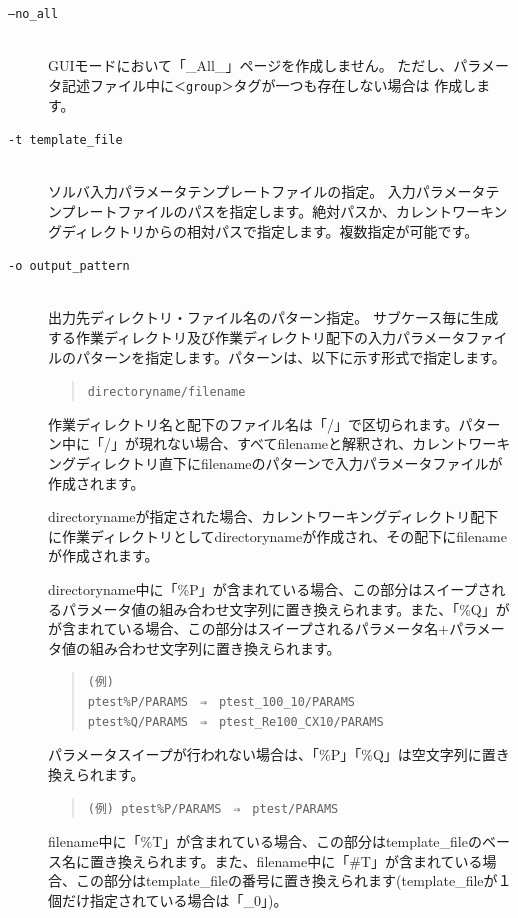 \documentclass[a4paper,11pt]{jarticle}
\begin{document}
\begin{description}
\begin{description}
\item[{\tt --no\_all}] {\ }\\ 
GUIモードにおいて「\_All\_」ページを作成しません。
ただし、パラメータ記述ファイル中に{\tt ＜group＞}タグが一つも存在しない場合は
作成します。

\item[{\tt -t  template\_file}] {\ }\\
ソルバ入力パラメータテンプレートファイルの指定。
入力パラメータテンプレートファイルのパスを指定します。絶対パスか、カレントワーキングディレクトリからの相対パスで指定します。複数指定が可能です。

\item[{\tt -o  output\_pattern}] {\ }\\
出力先ディレクトリ・ファイル名のパターン指定。
サブケース毎に生成する作業ディレクトリ及び作業ディレクトリ配下の入力パラメータファイルのパターンを指定します。パターンは、以下に示す形式で指定します。
\begin{quote}
{\tt directoryname/filename}
\end{quote}
作業ディレクトリ名と配下のファイル名は「/」で区切られます。パターン中に「/」が現れない場合、すべてfilenameと解釈され、カレントワーキングディレクトリ直下にfilenameのパターンで入力パラメータファイルが作成されます。

directorynameが指定された場合、カレントワーキングディレクトリ配下に作業ディレクトリとしてdirectorynameが作成され、その配下にfilenameが作成されます。

directoryname中に「\%P」が含まれている場合、この部分はスイープされるパラメータ値の組み合わせ文字列に置き換えられます。また、「\%Q」がが含まれている場合、この部分はスイープされるパラメータ名+パラメータ値の組み合わせ文字列に置き換えられます。
\begin{quote}
\begin{verbatim}
(例)
ptest%P/PARAMS　⇒　ptest_100_10/PARAMS
ptest%Q/PARAMS　⇒　ptest_Re100_CX10/PARAMS
\end{verbatim}
\end{quote}

パラメータスイープが行われない場合は、「\%P」「\%Q」は空文字列に置き換えられます。
\begin{quote}
{\tt (例) ptest\%P/PARAMS　⇒　ptest/PARAMS}
\end{quote}

filename中に「\%T」が含まれている場合、この部分はtemplate\_fileのベース名に置き換えられます。また、filename中に「\#T」が含まれている場合、この部分はtemplate\_fileの番号に置き換えられます(template\_fileが１個だけ指定されている場合は「\_0」)。


\end{description}
\end{description}
\end{document}
